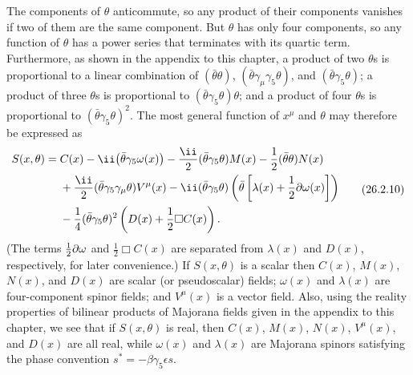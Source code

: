 The components of $\theta$ anticommute, so any product of their components
vanishes if two of them are the same component. But $\theta$ has only four
components, so any function of $\theta$ has a power series that terminates
with its quartic term. Furthermore, as shown in the appendix to this chapter,
a product of two $\theta$s is proportional to a linear combination of
$(\bar\theta\theta)$, $(\bar\theta\gamma_\mu\gamma_5\theta)$, and
$(\bar\theta\gamma_5\theta)$; a product of three $\theta$s is proportional to
$(\bar\theta\gamma_5\theta)\theta$; and a product of four $\theta$s is
proportional to $(\bar\theta\gamma_5\theta)^2$. The most general function of
$x^\mu$ and $\theta$ may therefore be expressed as
\begin{equation}
  \begin{aligned}
  S(x,\theta)={}&C(x)-\ii\bigl(\bar\theta\gamma_5\omega(x)\bigr)
  -\frac{\ii}{2}(\bar\theta\gamma_5\theta)M(x)
  -\frac{1}{2}(\bar\theta\theta)N(x)\\
  &+\frac{\ii}{2}(\bar\theta\gamma_5\gamma_\mu\theta)V^\mu(x)
  -\ii(\bar\theta\gamma_5\theta)
    \left(\bar\theta\left[\lambda(x)+\frac{1}{2}\sl{\partial}\omega(x)\right]\right)\\
  &-\frac{1}{4}(\bar\theta\gamma_5\theta)^2
    \left(D(x)+\frac{1}{2}\Box C(x)\right).
  \end{aligned}
  \tag{26.2.10}\label{eq:26.2.10}
\end{equation}
(The terms $\frac12\sl{\partial}\omega$ and $\frac12\Box C(x)$ are separated
from $\lambda(x)$ and $D(x)$, respectively, for later convenience.) If
$S(x,\theta)$ is a scalar then $C(x)$, $M(x)$, $N(x)$, and $D(x)$ are scalar
(or pseudoscalar) fields; $\omega(x)$ and $\lambda(x)$ are four-component
spinor fields; and $V^\mu(x)$ is a vector field. Also, using the reality
properties of bilinear products of Majorana fields given in the appendix to
this chapter, we see that if $S(x,\theta)$ is real, then $C(x)$, $M(x)$,
$N(x)$, $V^\mu(x)$, and $D(x)$ are all real, while $\omega(x)$ and
$\lambda(x)$ are Majorana spinors satisfying the phase convention
$s^*=-\beta\gamma_5\epsilon s$.

